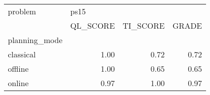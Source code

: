 \begin{tabular}{lrrr}
\toprule
problem & \multicolumn{3}{l}{ps15} \\
{} & QL\_SCORE & TI\_SCORE & GRADE \\
planning\_mode &          &          &       \\
\midrule
classical     &     1.00 &     0.72 &  0.72 \\
offline       &     1.00 &     0.65 &  0.65 \\
online        &     0.97 &     1.00 &  0.97 \\
\bottomrule
\end{tabular}
